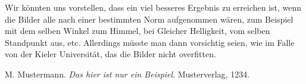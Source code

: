 \documentclass[a4,german]{article}
\begin{document}
Wir könnten uns vorstellen, dass ein viel besseres Ergebnis zu erreichen ist, wenn die Bilder alle nach einer bestimmten Norm aufgenommen wären, zum Beispiel mit dem selben Winkel zum Himmel, bei Gleicher Helligkeit, vom selben Standpunkt aus, etc. Allerdings müsste man dann vorsichtig seien, wie im Falle von der Kieler Universität, das die Bilder nicht overfitten. 


\begin{thebibliography}{99}
	
 M. Mustermann. \textit{Das hier ist nur ein Beispiel}. Musterverlag, 1234.

\end{thebibliography}
\end{document}
